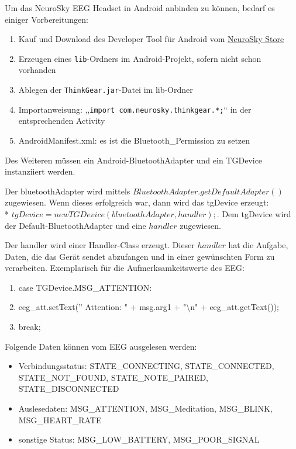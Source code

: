 	Um das NeuroSky EEG Headset in Android anbinden zu können, bedarf es einiger Vorbereitungen:
	\begin{enumerate}
	\item Kauf und Download des Developer Tool für Android vom \href{http://store.neurosky.com/products/developer-tools-3-android} {NeuroSky Store}
	\item Erzeugen eines \texttt{lib}-Ordners im Android-Projekt, sofern nicht schon vorhanden
	\item Ablegen der \texttt{ThinkGear.jar}-Datei im lib-Ordner
	\item Importanweisung: ,,\texttt{import com.neurosky.thinkgear.*;}`` in der entsprechenden Activity
	\item AndroidManifest.xml: es ist die Bluetooth\_Permission zu setzen
	\end{enumerate}
	
	Des Weiteren müssen ein Android-BluetoothAdapter und ein TGDevice instanziiert werden.

	Der bluetoothAdapter wird mittels $BluetoothAdapter.getDefaultAdapter()$ zugewiesen. Wenn dieses erfolgreich war, dann wird das tgDevice erzeugt: \\* $tgDevice = new TGDevice(bluetoothAdapter, handler);$. Dem tgDevice wird der Default-BluetoothAdapter und eine $handler$ zugewiesen. 
	
	Der handler \label{handler} wird einer Handler-Class erzeugt. Dieser $handler$ hat die Aufgabe, Daten, die das Gerät sendet abzufangen und in einer gewünschten Form zu verarbeiten. Exemplarisch für die Aufmerksamkeitswerte des EEG:
	
	\begin{enumerate}
	\item case TGDevice.MSG\_ATTENTION:
    \item eeg\_att.setText('' Attention: " + msg.arg1 + "\textbackslash n" + eeg\_att.getText());
	\item break;
	\end{enumerate}
	
	Folgende Daten können vom EEG ausgelesen werden:
	
	\begin{itemize}
	\item Verbindungsstatus: STATE\_CONNECTING, STATE\_CONNECTED, \\STATE\_NOT\_FOUND, STATE\_NOTE\_PAIRED, STATE\_DISCONNECTED
	\item Auslesedaten: MSG\_ATTENTION, MSG\_Meditation, MSG\_BLINK, \\MSG\_HEART\_RATE
	\item sonstige Status: MSG\_LOW\_BATTERY, MSG\_POOR\_SIGNAL
	\end{itemize}
	
